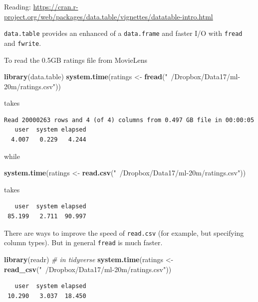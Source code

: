 \documentclass[]{book}
\newenvironment{Shaded}{\begin{snugshade}}{\end{snugshade}}
\newcommand{\KeywordTok}[1]{\textcolor[rgb]{0.13,0.29,0.53}{\textbf{#1}}}
\newcommand{\StringTok}[1]{\textcolor[rgb]{0.31,0.60,0.02}{#1}}
\newcommand{\CommentTok}[1]{\textcolor[rgb]{0.56,0.35,0.01}{\textit{#1}}}
\newcommand{\NormalTok}[1]{#1}
\theoremstyle{definition}
\theoremstyle{definition}
\theoremstyle{definition}
\theoremstyle{remark}
\begin{document}
Reading:
\url{https://cran.r-project.org/web/packages/data.table/vignettes/datatable-intro.html}

\texttt{data.table} provides an enhanced of a \texttt{data.frame} and
faster I/O with \texttt{fread} and \texttt{fwrite}.

To read the 0.5GB ratings file from MovieLens

\begin{Shaded}
\begin{Highlighting}[]
\KeywordTok{library}\NormalTok{(data.table)}
\KeywordTok{system.time}\NormalTok{(ratings <-}\StringTok{ }\KeywordTok{fread}\NormalTok{(}\StringTok{"~/Dropbox/Data17/ml-20m/ratings.csv"}\NormalTok{))}
\end{Highlighting}
\end{Shaded}

takes

\begin{verbatim}
Read 20000263 rows and 4 (of 4) columns from 0.497 GB file in 00:00:05
   user  system elapsed 
  4.007   0.229   4.244
\end{verbatim}

while

\begin{Shaded}
\begin{Highlighting}[]
\KeywordTok{system.time}\NormalTok{(ratings <-}\StringTok{ }\KeywordTok{read.csv}\NormalTok{(}\StringTok{"~/Dropbox/Data17/ml-20m/ratings.csv"}\NormalTok{))}
\end{Highlighting}
\end{Shaded}

takes

\begin{verbatim}
   user  system elapsed 
 85.199   2.711  90.997 
\end{verbatim}

There are ways to improve the speed of \texttt{read.csv} (for example,
but specifying column types). But in general \texttt{fread} is much
faster.

\begin{Shaded}
\begin{Highlighting}[]
\KeywordTok{library}\NormalTok{(readr) }\CommentTok{# in tidyverse}
\KeywordTok{system.time}\NormalTok{(ratings <-}\StringTok{ }\KeywordTok{read_csv}\NormalTok{(}\StringTok{"~/Dropbox/Data17/ml-20m/ratings.csv"}\NormalTok{))}
\end{Highlighting}
\end{Shaded}

\begin{verbatim}
   user  system elapsed 
 10.290   3.037  18.450 
\end{verbatim}
\end{document}
